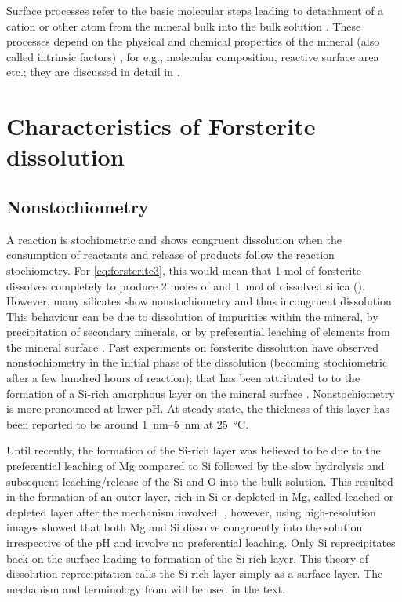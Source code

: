 Surface processes refer to the basic molecular steps leading to detachment of a cation or other atom from the mineral bulk into the bulk solution \citep{Brantley2008c}. These processes depend on the physical and chemical properties of the mineral (also called intrinsic factors) \citep{white2002}, for e.g., molecular composition, reactive surface area etc.; they are discussed in detail in . 

\section{Characteristics of Forsterite dissolution}\label{sec:rate_control}

\subsection{Nonstochiometry}\label{subsec:nonstochio}
A reaction is stochiometric and shows congruent dissolution when the consumption of reactants and release of products follow the reaction stochiometry. For \cref{eq:forsterite3}, this would mean that 1 mol of forsterite dissolves completely to produce 2 moles of  and \SI{1}{\mol} of dissolved silica (). However, many silicates show nonstochiometry and thus incongruent dissolution. This behaviour can be due to dissolution of impurities within the mineral, by precipitation of secondary minerals, or by preferential leaching of elements from the mineral surface \citep{Brantley2008b}. Past experiments on forsterite dissolution have observed nonstochiometry in the initial phase of the dissolution (becoming stochiometric after a few hundred hours of reaction); that has been attributed to to the formation of a Si-rich amorphous layer on the mineral surface \citep{wogelius1992,pokrovsky2000,hellmann2012}. Nonstochiometry is more pronounced at lower pH. At steady state, the thickness of this layer has been reported to be around \SIrange[range-units = single,range-phrase = --]{1}{5}{\nano\meter} \citep{pokrovsky2000,hellmann2012} at \SI{25}{\degreeCelsius}.

Until recently, the formation of the Si-rich layer was believed to be due to the preferential leaching of Mg compared to Si \citep{luce1972,paces1973,pokrovsky2000,lee2008}  followed by the slow hydrolysis and subsequent leaching/release of the Si and O into the bulk solution. This resulted in the formation of an outer layer, rich in Si or depleted in Mg, called leached or depleted layer after the mechanism involved. \cite{hellmann2012}, however, using high-resolution images showed that both Mg and Si dissolve congruently into the solution irrespective of the pH and involve no preferential leaching. Only Si reprecipitates back on the surface leading to formation of the Si-rich layer. This theory of dissolution-reprecipitation calls the Si-rich layer simply as a surface layer. The mechanism and terminology from \cite{hellmann2012} will be used in the text.

